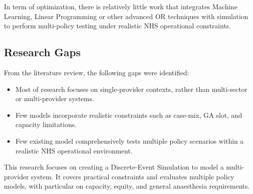 \documentclass[ %
                    author={Nattanan Nawakitbamrung},
                supervisor={Dr. Sébastien Rochat},
                    degree={MSc},
                     title={Developing and Evaluating the Impact of a Single Patient Treatment List (PTL) for an NHS Integrated Care System},
                  subtitle={},
                      type={},
                      year={2025}]{dissertation}
\begin{document}
In term of optimization, there is relatively little work that integrates Machine Learning, Linear Programming or other advanced OR techniques with simulation to perform multi-policy testing under realistic NHS operational constraints.

\subsection{Research Gaps}
From the literature review, the following gaps were identified:
\begin{itemize}
    \item Most of research focuses on single-provider contexts, rather than multi-sector or multi-provider systems.
    \item Few models incorporate realistic constraints such as case-mix, GA slot, and capacity limitations.
    \item Few existing model comprehensively tests multiple policy scenarios within a realistic NHS operational environment.
\end{itemize}
This research focuses on creating a Discrete-Event Simulation to model a multi-provider system. It covers practical constraints and evaluates multiple policy models, with particular on capacity, equity, and general anaesthesia requirements.

\clearpage
\end{document}
